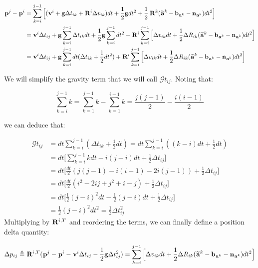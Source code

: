 \documentclass[11pt]{article}
\newcommand{\Rot}[2]{\prescript{#1}{}{\bfR}_{#2}}
\newcommand{\noise}{\bfn}
\newcommand{\posi}[2]{\prescript{#1}{}{\bfp}_{#2}}
\newcommand{\vel}[2]{\prescript{#1}{}{\bfv}_{#2}}
\newcommand{\acc}[2]{\prescript{#1}{}{\bfa}_{#2}}
\newcommand{\accm}[2]{\prescript{#1}{}{\widetilde{\bfa}}_{#2}}
\newcommand{\grav}{\bfg}
\begin{document}
\begin{equation}
\begin{split}
\posi{}{}^{j} - \posi{}{}^{i} &= \sum_{k=i}^{j-1} \Big[
(\vel{}{}^i + \grav \Delta t_{ik} + \Rot{}{}^i \Delta v_{ik})dt 
+ \frac{1}{2}\grav dt^2 + \frac{1}{2}\Rot{}{}^{k}(\accm{}{}^k - \bfb_{\acc{}{}^k} - \noise_{\acc{}{}^k})dt^2 \Big]
\\
&= \vel{}{}^i \Delta t_{ij} + 
\grav\sum_{k=i}^{j-1} \Delta t_{ik} dt + \frac{1}{2}\grav \sum_{k=i}^{j-1} dt^2 +
\Rot{}{}^i\sum_{k=i}^{j-1} \Big[\Delta v_{ik}dt +  \frac{1}{2} \Delta R_{ik} (\accm{}{}^k - \bfb_{\acc{}{}^k} - \noise_{\acc{}{}^k})dt^2 \Big]
\\
&= \vel{}{}^i \Delta t_{ij} + 
\grav \sum_{k=i}^{j-1}dt (\Delta t_{ik} + \frac{1}{2}dt^2) +
\Rot{}{}^i\sum_{k=i}^{j-1} \Big[\Delta v_{ik}dt +  \frac{1}{2} \Delta R_{ik} (\accm{}{}^k - \bfb_{\acc{}{}^k} - \noise_{\acc{}{}^k})dt^2 \Big]
\end{split}
\end{equation}

We will simplify the gravity term that we will call $\mathcal{G}t_{ij}$. Noting that:

\begin{equation*}
    \sum_{k=i}^{j-1}k = \sum_{k=1}^{j-1}k - \sum_{k=1}^{i-1}k = \frac{j(j-1)}{2} - \frac{i(i-1)}{2} 
\end{equation*}

we can deduce that:

\begin{equation*}
\begin{split}
\mathcal{G}t_{ij} 
&= dt \sum_{k=i}^{j-1}(\Delta t_{ik} + \frac{1}{2}dt) = dt \sum_{k=i}^{j-1}((k -i)dt + \frac{1}{2}dt)
\\
&= dt \Big[ \sum_{k=i}^{j-1} k dt - i(j-i)dt + \frac{1}{2}\Delta t_{ij}  \Big] 
\\
&= dt \Big[ \frac{dt}{2} (j(j-1) - i(i-1) - 2i(j-1)) + \frac{1}{2}\Delta t_{ij} \Big] 
\\
&= dt \Big[ \frac{dt}{2} (i^2 - 2ij + j^2 + i - j) + \frac{1}{2}\Delta t_{ij} \Big] 
\\
&= dt \Big[ \frac{1}{2} (j-i)^2dt - \frac{1}{2}(j - i)dt + \frac{1}{2}\Delta t_{ij} \Big]
\\
&= \frac{1}{2} (j-i)^2dt^2 = \frac{1}{2} \Delta t_{ij}^2
\end{split}
\end{equation*}
Multiplying by $\Rot{}{}^{i,T}$ and reordering the terms, we can finally define a position delta quantity:

\begin{equation}
    \Delta p_{ij} \triangleq \Rot{}{}^{i,T}(\posi{}{}^j - \posi{}{}^i - \vel{}{}^i \Delta t_{ij} - \frac{1}{2} \grav \Delta t_{ij}^2) = \sum_{k=i}^{j-1} \Big[\Delta v_{ik}dt +  \frac{1}{2} \Delta R_{ik} (\accm{}{}^k - \bfb_{\acc{}{}^k} - \noise_{\acc{}{}^k})dt^2 \Big]
\end{equation}




\end{document}

